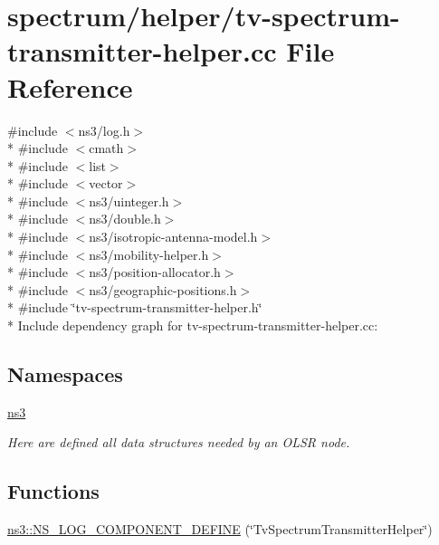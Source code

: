 \hypertarget{tv-spectrum-transmitter-helper_8cc}{}\section{spectrum/helper/tv-\/spectrum-\/transmitter-\/helper.cc File Reference}
\label{tv-spectrum-transmitter-helper_8cc}
{\ttfamily \#include $<$ns3/log.\+h$>$}\\*
{\ttfamily \#include $<$cmath$>$}\\*
{\ttfamily \#include $<$list$>$}\\*
{\ttfamily \#include $<$vector$>$}\\*
{\ttfamily \#include $<$ns3/uinteger.\+h$>$}\\*
{\ttfamily \#include $<$ns3/double.\+h$>$}\\*
{\ttfamily \#include $<$ns3/isotropic-\/antenna-\/model.\+h$>$}\\*
{\ttfamily \#include $<$ns3/mobility-\/helper.\+h$>$}\\*
{\ttfamily \#include $<$ns3/position-\/allocator.\+h$>$}\\*
{\ttfamily \#include $<$ns3/geographic-\/positions.\+h$>$}\\*
{\ttfamily \#include \char`\"{}tv-\/spectrum-\/transmitter-\/helper.\+h\char`\"{}}\\*
Include dependency graph for tv-\/spectrum-\/transmitter-\/helper.cc\+:
\subsection*{Namespaces}
\begin{DoxyCompactItemize}
\item 
 \hyperlink{namespacens3}{ns3}
\begin{DoxyCompactList}\small\item\em Here are defined all data structures needed by an O\+L\+SR node. \end{DoxyCompactList}\end{DoxyCompactItemize}
\subsection*{Functions}
\begin{DoxyCompactItemize}
\item 
\hyperlink{namespacens3_a93aa25f63f9c145ab8e1663cfb90af93}{ns3\+::\+N\+S\+\_\+\+L\+O\+G\+\_\+\+C\+O\+M\+P\+O\+N\+E\+N\+T\+\_\+\+D\+E\+F\+I\+NE} (\char`\"{}Tv\+Spectrum\+Transmitter\+Helper\char`\"{})
\end{DoxyCompactItemize}
